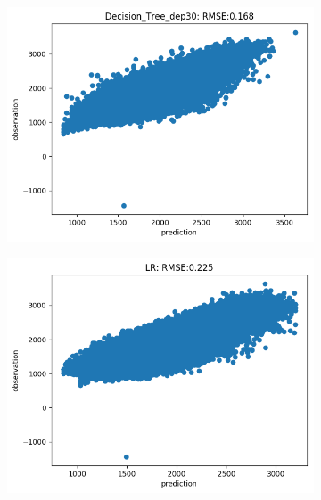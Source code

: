 \documentclass[11pt]{article}
\begin{document}
\begin{figure}[] 
\centering
\begin{subfigure}[!t]{0.2\textwidth}
        \includegraphics[width=\textwidth]{Decision_Tree_dep30_pred.png}
    \end{subfigure}
    \begin{subfigure}[!t]{0.2\textwidth}
        \includegraphics[width=\textwidth]{LR_pred.png}
    \end{subfigure}
        \begin{subfigure}[!t]{0.2\textwidth}

\end{subfigure}
\end{figure}
\end{document}
